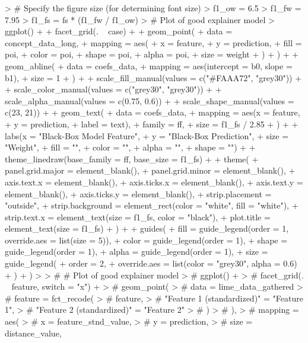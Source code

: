 \documentclass[AMS,STIX2COL]{WileyNJD-v2}
\begin{document}
\begin{figure*}[!thp]
\begin{Schunk}
\begin{Sinput}
> # Specify the figure size (for determining font size)
> f1_ow = 6.5
> f1_fw = 7.95
> f1_fs = fs * (f1_fw / f1_ow)
> # Plot of good explainer model
> ggplot() +
+   facet_grid(. ~ case) +
+   geom_point(
+     data = concept_data_long,
+     mapping = aes(
+       x = feature,
+       y = prediction,
+       fill = poi,
+       color = poi,
+       shape = poi,
+       alpha = poi,
+       size = weight
+     )
+   ) +
+   geom_abline(
+     data = coefs_data,
+     mapping = aes(intercept = b0, slope = b1),
+     size = 1
+   ) +
+   scale_fill_manual(values = c("#FAAA72", "grey30")) +
+   scale_color_manual(values = c("grey30", "grey30")) +
+   scale_alpha_manual(values = c(0.75, 0.6)) +
+   scale_shape_manual(values = c(23, 21)) +
+   geom_text(
+     data = coefs_data,
+     mapping = aes(x = feature,
+                   y = prediction,
+                   label = text),
+     family = ff,
+     size = f1_fs / 2.85
+   ) +
+   labs(x = "Black-Box Model Feature",
+        y = "Black-Box Prediction",
+        size = "Weight", 
+        fill = "", 
+        color = "",
+        alpha = "",
+        shape = "") +
+   theme_linedraw(base_family = ff, base_size = f1_fs) +
+   theme(
+     panel.grid.major = element_blank(),
+     panel.grid.minor = element_blank(),
+     axis.text.x = element_blank(),
+     axis.ticks.x = element_blank(),
+     axis.text.y = element_blank(),
+     axis.ticks.y = element_blank(),
+     strip.placement = "outside",
+     strip.background = element_rect(color = "white", fill = "white"),
+     strip.text.x = element_text(size = f1_fs, color = "black"),
+     plot.title = element_text(size = f1_fs)
+   ) +
+   guides(
+     fill = guide_legend(order = 1, override.aes = list(size = 5)),
+     color = guide_legend(order = 1),
+     shape = guide_legend(order = 1),
+     alpha = guide_legend(order = 1),
+     size = guide_legend(
+       order = 2,
+       override.aes = list(color = "grey30", alpha = 0.6)
+     )
+   )
> 
> # # Plot of good explainer model
> # ggplot() +
> #   facet_grid(. ~ feature, switch = "x") +
> #   geom_point(
> #     data = lime_data_gathered %>% mutate(
> #       feature = fct_recode(
> #         feature,
> #         "Feature 1 (standardized)" = "Feature 1",
> #         "Feature 2 (standardized)" = "Feature 2"
> #       )
> #     ),
> #     mapping = aes(
> #       x = feature_stnd_value,
> #       y = prediction,
> #       size = distance_value,

\end{Sinput}
\end{Schunk}
\end{figure*}
\end{document}
